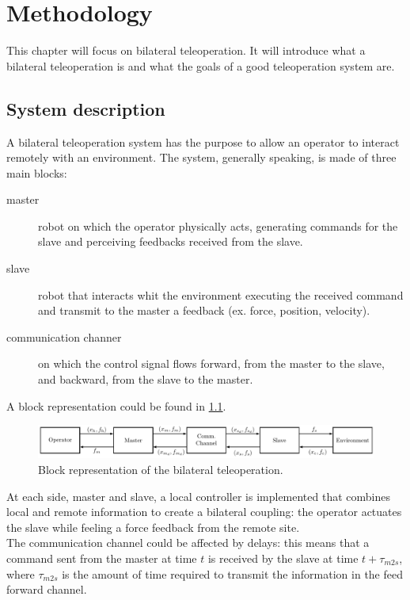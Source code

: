 \chapter{Methodology} 
This chapter will focus on bilateral teleoperation.
It will introduce what a bilateral teleoperation is and what the goals of a good teleoperation system are.

 \section{System description}
A bilateral teleoperation system has the purpose to allow an operator to interact remotely with an environment. The system, generally speaking, is made of three main blocks: 
\begin{description}
	\item[master] robot on which the operator physically acts, generating commands for the slave and perceiving feedbacks received from the slave. 
	\item[slave] robot that interacts whit the environment executing the received command and transmit to the master a feedback (ex. force, position, velocity).
	\item[communication channer] on which the control signal flows forward, from the master to the slave, and backward, from the slave to the master.
\end{description}
A block representation could be found in \figurename{\ref{sch:bilateral_teleop}}.\\
\begin{figure}
	\includegraphics[width=\textwidth]{schemas/Bilateral_Teleop.pdf}
	\caption[Block representation of the bilateral teleoperation]{Block representation of the bilateral teleoperation.}
	\label{sch:bilateral_teleop}
\end{figure}
At each side, master and slave, a local controller is implemented that combines local and remote information to create a bilateral coupling: the operator actuates the slave while feeling a force feedback from the remote site.\\
The communication channel could be affected by delays: this means that a command sent from the master at time $t$ is received by the slave at time $t + \tau_{m2s}$, where $\tau_{m2s}$ is the amount of time required to transmit the information in the feed forward channel.\\
